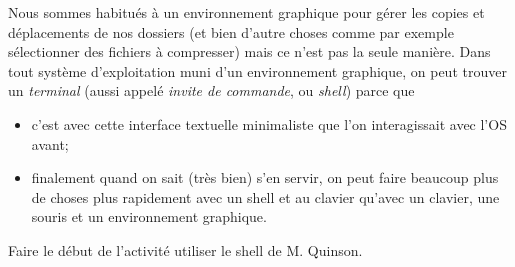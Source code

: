 	Nous sommes habitués à un environnement graphique pour gérer les copies et déplacements de nos dossiers (et bien d'autre choses comme par exemple sélectionner des fichiers à compresser) mais ce n'est pas la seule manière. Dans tout système d'exploitation muni d'un environnement graphique, on peut trouver un \textit{terminal} (aussi appelé \textit{invite de commande}, ou \textit{shell}) parce que
	\begin{itemize}
		\item 	c'est avec cette interface textuelle minimaliste que l'on interagissait avec l'\textsc{OS} avant;
		\item 	finalement quand on sait (très bien) s'en servir, on peut faire beaucoup plus de choses plus rapidement avec un shell et au clavier qu'avec un clavier, une souris et un environnement graphique.
	\end{itemize}

	\begin{exercice}[]
		Faire le début de l'activité \og utiliser le shell\fg{} de M. Quinson.

	\end{exercice}
	